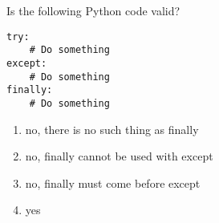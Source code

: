 \question
Is the following Python code valid?

\begin{lstlisting}
try:
    # Do something
except:
    # Do something
finally:
    # Do something
\end{lstlisting}
\begin{enumerate}
\item no, there is no such thing as finally
\item no, finally cannot be used with except
\item no, finally must come before except
\item yes
\end{enumerate}

